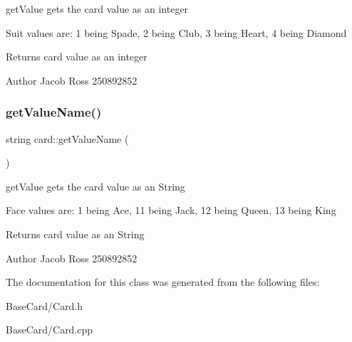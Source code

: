 get\+Value gets the card value as an integer 

Suit values are\+: 1 being Spade, 2 being Club, 3 being Heart, 4 being Diamond \begin{DoxyReturn}{Returns}
card value as an integer 
\end{DoxyReturn}
\begin{DoxyAuthor}{Author}
Jacob Ross 250892852 
\end{DoxyAuthor}
\mbox{\label{classcard_a1fb74af5bd396a5b721adedf3f04af17}} 
\subsubsection{\texorpdfstring{get\+Value\+Name()}{getValueName()}}
{\footnotesize\ttfamily string card\+::get\+Value\+Name (\begin{DoxyParamCaption}{ }\end{DoxyParamCaption})}



get\+Value gets the card value as an String 

Face values are\+: 1 being Ace, 11 being Jack, 12 being Queen, 13 being King \begin{DoxyReturn}{Returns}
card value as an String 
\end{DoxyReturn}
\begin{DoxyAuthor}{Author}
Jacob Ross 250892852 
\end{DoxyAuthor}


The documentation for this class was generated from the following files\+:\begin{DoxyCompactItemize}
\item 
Base\+Card/Card.\+h\item 
Base\+Card/Card.\+cpp\end{DoxyCompactItemize}
